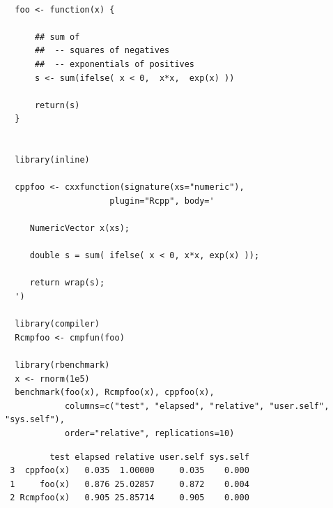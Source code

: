 \documentclass[11pt]{article}
\begin{document}
\begin{verbatim}
  
  foo <- function(x) {
  
      ## sum of
      ##  -- squares of negatives
      ##  -- exponentials of positives
      s <- sum(ifelse( x < 0,  x*x,  exp(x) ))
  
      return(s)
  }
  
  
  library(inline)
  
  cppfoo <- cxxfunction(signature(xs="numeric"),
                     plugin="Rcpp", body='
  
     NumericVector x(xs);
  
     double s = sum( ifelse( x < 0, x*x, exp(x) ));
  
     return wrap(s);
  ')
  
  library(compiler)
  Rcmpfoo <- cmpfun(foo)
  
  library(rbenchmark)
  x <- rnorm(1e5)
  benchmark(foo(x), Rcmpfoo(x), cppfoo(x),
            columns=c("test", "elapsed", "relative", "user.self", "sys.self"),
            order="relative", replications=10)
\end{verbatim}

\begin{verbatim}
         test elapsed relative user.self sys.self
 3  cppfoo(x)   0.035  1.00000     0.035    0.000
 1     foo(x)   0.876 25.02857     0.872    0.004
 2 Rcmpfoo(x)   0.905 25.85714     0.905    0.000
\end{verbatim}
\end{document}
